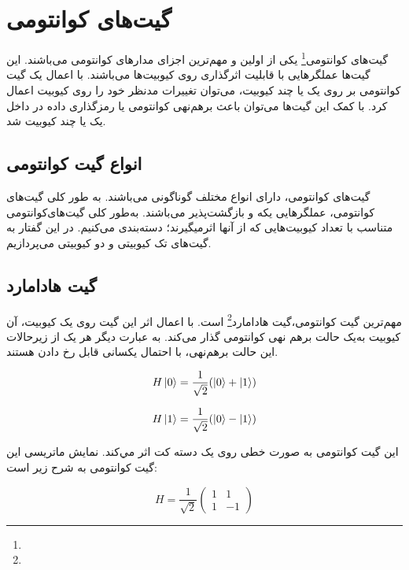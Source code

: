 \documentclass{book}
\begin{document}
\section{گیت‌های کوانتومی}
گیت‌های کوانتومی\footnote{} یکی از اولین و مهم‌ترین اجزای‌ مدار‌های کوانتومی ‌می‌باشند. این گیت‌ها عملگر‌هایی با قابلیت اثر‌گذاری روی کیوبیت‌ها می‌باشند. با اعمال یک گیت کوانتومی بر روی یک یا چند کیوبیت، می‌توان تغییرات مدنظر خود را روی کیوبیت اعمال کرد. با کمک این گیت‌ها می‌توان باعث برهم‌نهی کوانتومی یا رمز‌گذاری داده در داخل یک یا چند کیوبیت شد.

\subsection{انواع گیت کوانتومی}
گیت‌های کوانتومی، دارای انواع مختلف گوناگونی می‌باشند. به طور کلی گیت‌های کوانتومی، عملگر‌هایی یکه و بازگشت‌پذیر می‌باشند. به‌طور کلی گیت‌های‌کوانتومی متناسب با تعداد کیوبیت‌هایی که از آنها اثر‌میگیرند؛ دسته‌بندی می‌کنیم. در این گفتار به گیت‌های تک کیوبیتی و دو کیوبیتی می‌پردازیم.
\subsection*{گیت هادامارد}
مهم‌ترین گیت کوانتومی،‌گیت هادامارد\footnote{} است. با اعمال اثر این گیت روی یک کیوبیت، آن کیوبیت به‌یک حالت برهم نهی‌ کوانتومی‌ گذار‌ می‌کند. به عبارت دیگر هر یک از زیرحالات این حالت برهم‌نهی، با احتمال یکسانی قابل رخ دادن‌ هستند. 
\vspace{1cm}


\begin{center}
	\begin{equation}\label{basis to forier}
H\ket{0} = \frac{1}{\sqrt{2}} (\ket{0} + \ket{1})
\end{equation}
\end{center}
\hspace{1cm}
\begin{center}
	\begin{equation}\label{basis to forier}
H\ket{1} = \frac{1}{\sqrt{2}} (\ket{0} - \ket{1})
\end{equation}
\end{center}
\vspace{1cm}

این گیت کوانتومی‌ به صورت خطی روی یک دسته‌ کت اثر مي‌کند. نمایش ماتریسی این گیت‌ کوانتومی به شرح زیر است:
\begin{center}
	\begin{equation}\label{Hadamard matrix}
		H = \frac{1}{\sqrt{2}}
		\begin{pmatrix}
			1 & 1 \\
			1 & -1
		\end{pmatrix}
	\end{equation}
\end{center}
\end{document}
